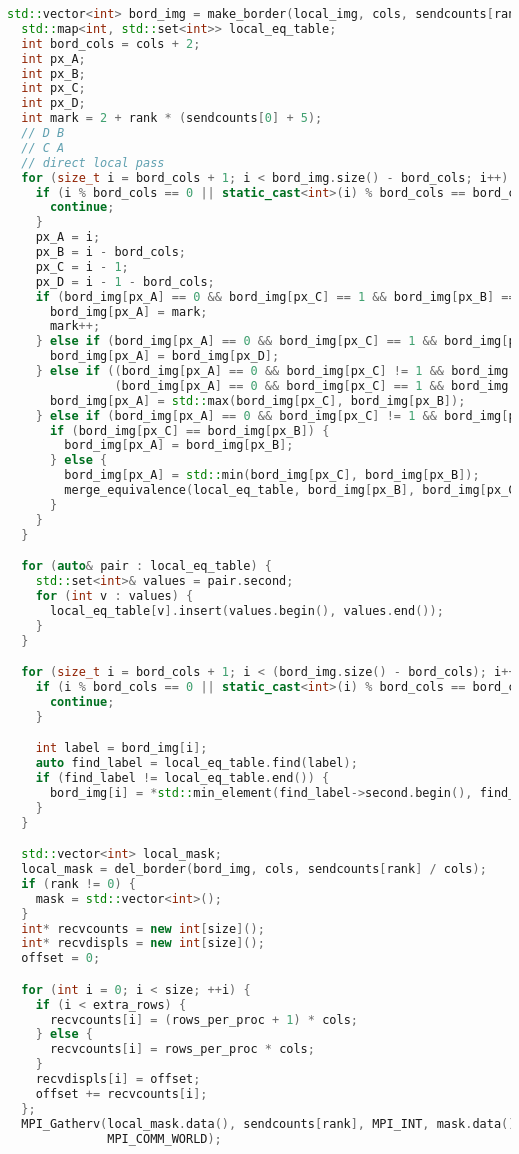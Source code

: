\documentclass[a4paper,12pt]{article}
\begin{document}
\begin{lstlisting}[language=C++,caption={Фрагмент MPI-версии}]
  std::vector<int> bord_img = make_border(local_img, cols, sendcounts[rank] / cols);
  std::map<int, std::set<int>> local_eq_table;
  int bord_cols = cols + 2;
  int px_A;
  int px_B;
  int px_C;
  int px_D;
  int mark = 2 + rank * (sendcounts[0] + 5);
  // D B
  // C A
  // direct local pass
  for (size_t i = bord_cols + 1; i < bord_img.size() - bord_cols; i++) {
    if (i % bord_cols == 0 || static_cast<int>(i) % bord_cols == bord_cols - 1) {
      continue;
    }
    px_A = i;
    px_B = i - bord_cols;
    px_C = i - 1;
    px_D = i - 1 - bord_cols;
    if (bord_img[px_A] == 0 && bord_img[px_C] == 1 && bord_img[px_B] == 1 && bord_img[px_D] == 1) {
      bord_img[px_A] = mark;
      mark++;
    } else if (bord_img[px_A] == 0 && bord_img[px_C] == 1 && bord_img[px_B] == 1 && bord_img[px_D] != 1) {
      bord_img[px_A] = bord_img[px_D];
    } else if ((bord_img[px_A] == 0 && bord_img[px_C] != 1 && bord_img[px_B] == 1) ||
               (bord_img[px_A] == 0 && bord_img[px_C] == 1 && bord_img[px_B] != 1)) {
      bord_img[px_A] = std::max(bord_img[px_C], bord_img[px_B]);
    } else if (bord_img[px_A] == 0 && bord_img[px_C] != 1 && bord_img[px_B] != 1) {
      if (bord_img[px_C] == bord_img[px_B]) {
        bord_img[px_A] = bord_img[px_B];
      } else {
        bord_img[px_A] = std::min(bord_img[px_C], bord_img[px_B]);
        merge_equivalence(local_eq_table, bord_img[px_B], bord_img[px_C]);
      }
    }
  }

  for (auto& pair : local_eq_table) {
    std::set<int>& values = pair.second;
    for (int v : values) {
      local_eq_table[v].insert(values.begin(), values.end());
    }
  }

  for (size_t i = bord_cols + 1; i < (bord_img.size() - bord_cols); i++) {
    if (i % bord_cols == 0 || static_cast<int>(i) % bord_cols == bord_cols - 1) {
      continue;
    }

    int label = bord_img[i];
    auto find_label = local_eq_table.find(label);
    if (find_label != local_eq_table.end()) {
      bord_img[i] = *std::min_element(find_label->second.begin(), find_label->second.end());
    }
  }

  std::vector<int> local_mask;
  local_mask = del_border(bord_img, cols, sendcounts[rank] / cols);
  if (rank != 0) {
    mask = std::vector<int>();
  }
  int* recvcounts = new int[size]();
  int* recvdispls = new int[size]();
  offset = 0;

  for (int i = 0; i < size; ++i) {
    if (i < extra_rows) {
      recvcounts[i] = (rows_per_proc + 1) * cols;
    } else {
      recvcounts[i] = rows_per_proc * cols;
    }
    recvdispls[i] = offset;
    offset += recvcounts[i];
  };
  MPI_Gatherv(local_mask.data(), sendcounts[rank], MPI_INT, mask.data(), recvcounts, recvdispls, MPI_INT, 0,
              MPI_COMM_WORLD);


\end{lstlisting}
\end{document}
